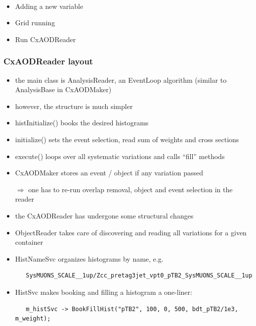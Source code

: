 \documentclass{beamer}
\begin{document}
\begin{frame}
\begin{center}
\\
\vspace{5mm}
\begin{minipage}{0.5\textwidth}
\begin{itemize}
 \item Adding a new variable
 \item Grid running
 \item Run CxAODReader
\end{itemize}
\end{minipage}
\end{center}
\end{frame}


\begin{frame}
\begin{center}
\end{center}
\end{frame}

\begin{frame}[fragile]
\frametitle{CxAODReader layout}
\begin{itemize}
 \item the main class is AnalysisReader, an EventLoop algorithm (similar to AnalysisBase in CxAODMaker)
 \item however, the structure is much simpler
 \item histInitialize() books the desired histograms
 \item initialize() sets the event selection, read sum of weights and cross sections
 \item execute() loops over all systematic variations and calls ``fill'' methods
\end{itemize}
\begin{itemize}
 \item CxAODMaker stores an event / object if any variation passed
 \item[$\Rightarrow$] one has to re-run overlap removal, object and event selection in the reader
\end{itemize}
\begin{itemize}
 \item the CxAODReader has undergone some structural changes
 \item ObjectReader takes care of discovering and reading all variations for a given container
 \item HistNameSvc organizes histograms by name, e.g.
 \begin{verbatim}
   SysMUONS_SCALE__1up/Zcc_pretag3jet_vpt0_pTB2_SysMUONS_SCALE__1up
 \end{verbatim}
 \vspace{-5mm}
 \item HistSvc makes booking and filling a histogram a one-liner:
 \begin{verbatim}
   m_histSvc -> BookFillHist("pTB2", 100, 0, 500, bdt_pTB2/1e3, m_weight);
 \end{verbatim}
\end{itemize}
\end{frame}
\end{document}
